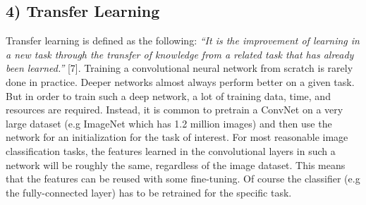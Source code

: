 \documentclass[a4paper]{article}
\begin{document}
\subsection*{4) Transfer Learning}
\begin{justify}
 Transfer learning is defined as the following: \textit{``It is the improvement of learning in a new task through the transfer of knowledge from a related task that has already been learned.''} [7]. Training a convolutional neural network from scratch is rarely done in practice. Deeper networks almost always perform better on a given task. But in order to train such a deep network, a lot of training data, time, and resources are required. Instead, it is common to pretrain a ConvNet on a very large dataset (e.g ImageNet which has 1.2 million images) and then use the network for an initialization for the task of interest. For most reasonable image classification tasks, the features learned in the convolutional layers in such a network will be roughly the same, regardless of the image dataset. This means that the features can be reused with some fine-tuning. Of course the classifier (e.g the fully-connected layer) has to be retrained for the specific task.   
\end{justify}
\end{document}
